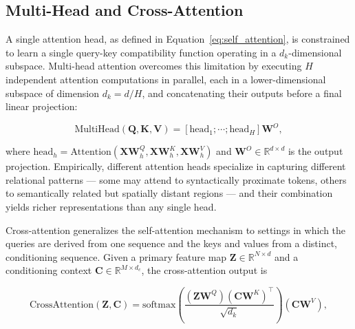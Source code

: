 \subsection{Multi-Head and Cross-Attention}
\label{subsec:multihead_cross_attention}

A single attention head, as defined in Equation~\ref{eq:self_attention}, is constrained to learn a single query-key compatibility function operating in a $d_k$-dimensional subspace. Multi-head attention \cite{vaswani2017attention} overcomes this limitation by executing $H$ independent attention computations in parallel, each in a lower-dimensional subspace of dimension $d_k = d / H$, and concatenating their outputs before a final linear projection:

\begin{equation}
    \text{MultiHead}(\mathbf{Q}, \mathbf{K}, \mathbf{V}) = \left[\text{head}_1; \cdots; \text{head}_H\right]\mathbf{W}^O,
    \label{eq:multihead}
\end{equation}

where $\text{head}_h = \text{Attention}(\mathbf{X}\mathbf{W}^Q_h, \mathbf{X}\mathbf{W}^K_h, \mathbf{X}\mathbf{W}^V_h)$ and $\mathbf{W}^O \in \mathbb{R}^{d \times d}$ is the output projection. Empirically, different attention heads specialize in capturing different relational patterns — some may attend to syntactically proximate tokens, others to semantically related but spatially distant regions — and their combination yields richer representations than any single head.

Cross-attention generalizes the self-attention mechanism to settings in which the queries are derived from one sequence and the keys and values from a distinct, conditioning sequence. Given a primary feature map $\mathbf{Z} \in \mathbb{R}^{N \times d}$ and a conditioning context $\mathbf{C} \in \mathbb{R}^{M \times d_c}$, the cross-attention output is

\begin{equation}
    \text{CrossAttention}(\mathbf{Z}, \mathbf{C}) = \text{softmax}\!\left(\frac{(\mathbf{Z}\mathbf{W}^Q)(\mathbf{C}\mathbf{W}^K)^\top}{\sqrt{d_k}}\right)(\mathbf{C}\mathbf{W}^V),
    \label{eq:cross_attention}
\end{equation}

